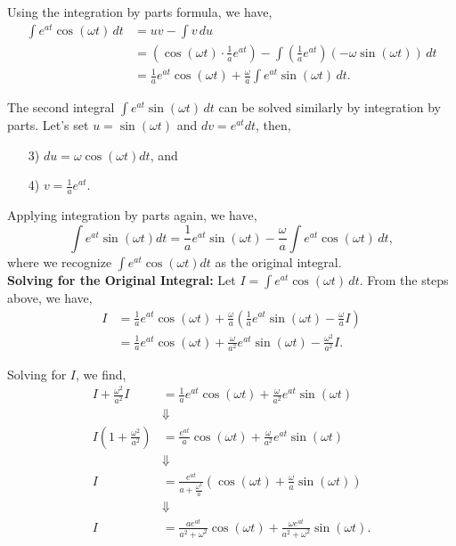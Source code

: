 \begin{enumerate}
\begin{itemize}
Using the integration by parts formula, we have,
\begin{align*}
    \int e^{at} \cos(\omega t) \, dt & = uv - \int v  \, du \\
    &= \left(\cos(\omega t) \cdot \frac{1}{a} e^{at}\right) - \int \left(\frac{1}{a} e^{at}\right) (-\omega \sin(\omega t))  \, dt \\
    &= \frac{1}{a} e^{at} \cos(\omega t) + \frac{\omega}{a} \int e^{at} \sin(\omega t)  \, dt.
\end{align*}


The second integral \(\int e^{at} \sin(\omega t)  \, dt\) can be solved similarly by integration by parts. Let's set \(u = \sin(\omega t)\) and \(dv = e^{at} dt\), then,
\begin{itemize}
    \item[3)] \(du = \omega \cos(\omega t) dt\), and 
    \item[4)] \(v = \frac{1}{a} e^{at}\).
\end{itemize}

Applying integration by parts again, we have,
\[
\int e^{at} \sin(\omega t) dt = \frac{1}{a} e^{at} \sin(\omega t) - \frac{\omega}{a} \int e^{at} \cos(\omega t)  \, dt,
\]
where we recognize $\int e^{at} \cos(\omega t) dt$ as the original integral.\\

\textbf{Solving for the Original Integral:} Let \(I = \int e^{at} \cos(\omega t)  \, dt\). From the steps above, we have,
\begin{align*}
I &= \frac{1}{a} e^{at} \cos(\omega t) + \frac{\omega}{a} \left( \frac{1}{a} e^{at} \sin(\omega t) - \frac{\omega}{a} I \right) \\
    &=  \frac{1}{a} e^{at} \cos(\omega t) + \frac{\omega}{a^2} e^{at} \sin(\omega t) - \frac{\omega^2}{a^2} I.
\end{align*}


Solving for \(I\), we find,
\begin{align*}
I + \frac{\omega^2}{a^2} I & = \frac{1}{a} e^{at} \cos(\omega t) + \frac{\omega}{a^2} e^{at} \sin(\omega t) \\
&\Downarrow \\
I \left(1 + \frac{\omega^2}{a^2}\right) & = \frac{e^{at}}{a} \cos(\omega t) + \frac{\omega}{a^2} e^{at} \sin(\omega t) \\
&\Downarrow \\
I& = \frac{e^{at}}{a + \frac{\omega^2}{a}} \left(\cos(\omega t) + \frac{\omega}{a} \sin(\omega t)\right) \\
&\Downarrow \\
I &= \frac{a e^{at}}{a^2 + \omega^2} \cos(\omega t) + \frac{\omega e^{at}}{a^2 + \omega^2} \sin(\omega t).
\end{align*}


\end{itemize}
\end{enumerate}
